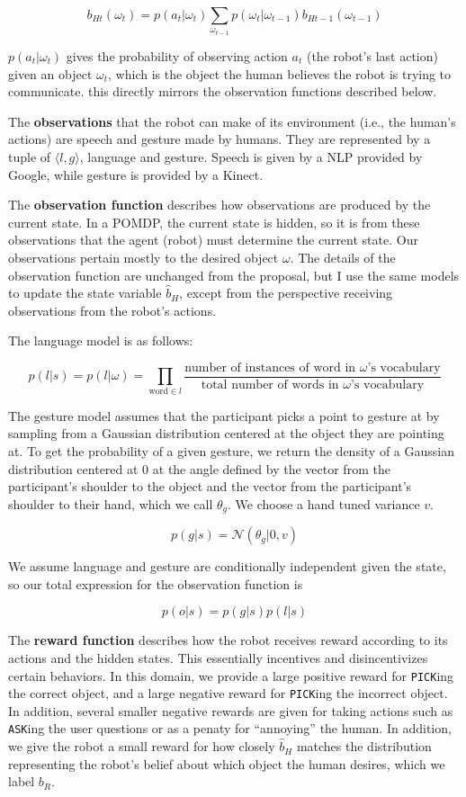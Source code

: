 \documentclass{article}
\begin{document}
$$b_{Ht}(\omega_t) = p(a_t | \omega_t) \sum_{\omega_{t-1}} p(\omega_t|\omega_{t-1}) b_{Ht-1}(\omega_{t-1})$$

$p(a_t | \omega_t)$ gives the probability of observing action $a_t$ (the robot's last action) given an object $\omega_t$, which is the object the human believes the robot is trying to communicate. this directly mirrors the observation functions described below. 

The \textbf{observations} that the robot can make of its environment (i.e., the human's actions) are speech and gesture made by humans. They are represented by a tuple of $\langle l, g \rangle$, language and gesture. Speech is given by a NLP provided by Google, while gesture is provided by a Kinect. 

The \textbf{observation function} describes how observations are produced by the current state. In a POMDP, the current state is hidden, so it is from these observations that the agent (robot) must determine the current state. Our observations pertain mostly to the desired object $\omega$. The details of the observation function are unchanged from the proposal, but I use the same models to update the state variable $\hat b_H$, except from the perspective receiving observations from the robot's actions. 

The language model is as follows: 

$$ p(l|s) = p(l|\omega) = \prod_{\text{word} \in l} \frac{\text{number of instances of word in $\omega$'s vocabulary}}{\text{total number of words in $\omega$'s vocabulary}}$$

The gesture model assumes that the participant picks a point to gesture at by sampling from a Gaussian distribution centered at the object they are pointing at. To get the probability of a given gesture, we return the density of a Gaussian distribution centered at 0 at the angle defined by the vector from the participant's shoulder to the object and the vector from the participant's shoulder to their hand, which we call $\theta_g$. We choose a hand tuned variance $v$. 

$$ p(g|s) = \mathcal{N}(\theta_g| 0, v)$$

We assume language and gesture are conditionally independent given the state, so our total expression for the observation function is 

$$ p(o|s) = p(g|s) p(l|s)$$


The \textbf{reward function} describes how the robot receives reward according to its actions and the hidden states. This essentially incentives and disincentivizes certain behaviors. In this domain, we provide a large positive reward for \texttt{PICK}ing the correct object, and a large negative reward for \texttt{PICK}ing the incorrect object. In addition, several smaller negative rewards are given for taking actions such as \texttt{ASK}ing the user questions or as a penaty for ``annoying'' the human. In addition, we give the robot a small reward for how closely $\hat b_H$ matches the distribution representing the robot's belief about which object the human desires, which we label $b_R$. 
\end{document}
